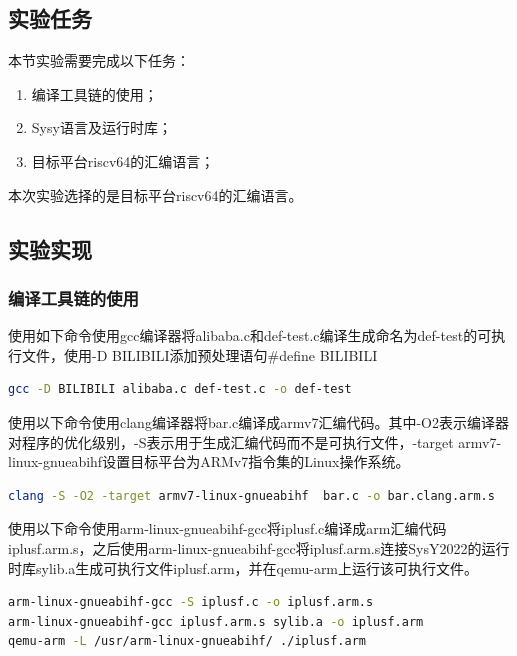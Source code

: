 \documentclass[supercite]{Experimental_Report}
\theoremstyle{definition}
\begin{document}
\subsection{实验任务}
本节实验需要完成以下任务：
\begin{enumerate}
  \item 编译工具链的使用；
  \item Sysy语言及运行时库；
  \item 目标平台riscv64的汇编语言；
\end{enumerate}

本次实验选择的是目标平台riscv64的汇编语言。
\subsection{实验实现}
\subsubsection{编译工具链的使用}
使用如下命令使用gcc编译器将alibaba.c和def-test.c编译生成命名为def-test的可执行文件，使用-D BILIBILI添加预处理语句\#define BILIBILI
\begin{center}
\begin{lstlisting}[language=bash]
gcc -D BILIBILI alibaba.c def-test.c -o def-test
\end{lstlisting}
\end{center}

使用以下命令使用clang编译器将bar.c编译成armv7汇编代码。其中-O2表示编译器对程序的优化级别，-S表示用于生成汇编代码而不是可执行文件，-target armv7-linux-gnueabihf设置目标平台为ARMv7指令集的Linux操作系统。

\begin{center}
\begin{lstlisting}[language=bash]
clang -S -O2 -target armv7-linux-gnueabihf  bar.c -o bar.clang.arm.s
\end{lstlisting}
\end{center}

使用以下命令使用arm-linux-gnueabihf-gcc将iplusf.c编译成arm汇编代码iplusf.arm.s，之后使用arm-linux-gnueabihf-gcc将iplusf.arm.s连接SysY2022的运行时库sylib.a生成可执行文件iplusf.arm，并在qemu-arm上运行该可执行文件。

\begin{center}
\begin{lstlisting}[language=bash]
arm-linux-gnueabihf-gcc -S iplusf.c -o iplusf.arm.s
arm-linux-gnueabihf-gcc iplusf.arm.s sylib.a -o iplusf.arm
qemu-arm -L /usr/arm-linux-gnueabihf/ ./iplusf.arm\end{lstlisting}
\end{center}
\end{document}
